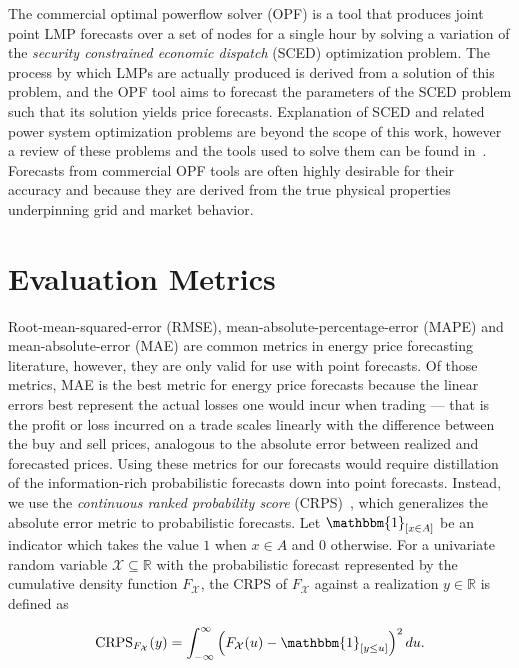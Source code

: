 The commercial optimal powerflow solver (OPF) is a tool that produces joint point LMP forecasts over a set of nodes
for a single hour by solving a variation of the \textit{security constrained economic dispatch} (SCED) optimization problem.
The process by which LMPs are actually produced is derived from a solution of this problem, and the OPF tool
aims to forecast the parameters of the SCED problem such that its solution yields price forecasts.
Explanation of SCED and related power system optimization problems are beyond the scope of this work, however a review
of these problems and the tools used to solve them can be found in~\cite{opf_textbook}.
Forecasts from commercial OPF tools are often highly desirable for their accuracy and because they are derived from the
true physical properties underpinning grid and market behavior.

\section{Evaluation Metrics}\label{sec:evaluation-metrics}

Root-mean-squared-error (RMSE), mean-absolute-percentage-error (MAPE) and mean-absolute-error (MAE) are common metrics
in energy price forecasting literature, however, they are only valid for use with point forecasts.
Of those metrics, MAE is the best metric for energy price forecasts because the linear errors best
represent the actual losses one would incur when trading --- that is the profit or loss incurred on a trade scales
linearly with the difference between the buy and sell prices, analogous to the absolute error between realized and
forecasted prices.
Using these metrics for our forecasts would require distillation of the information-rich probabilistic forecasts
down into point forecasts.
Instead, we use the \textit{continuous ranked probability score} (CRPS)~\cite{crps_rules}, which generalizes the absolute error
metric to probabilistic forecasts.
Let $\mathbbm{1}_{\left[x \in A\right]}$ be an indicator which takes the value $1$ when $x \in A$ and $0$ otherwise.
For a univariate random variable $\mathcal{X} \subseteq \mathbb{R}$ with the probabilistic forecast represented by the
cumulative density function $F_\mathcal{X}$, the CRPS of $F_\mathcal{X}$ against a realization $y \in \mathbb{R}$ is defined
as

\begin{equation}
    \text{CRPS}_{F_\mathcal{X}}(y) = \int_{-\infty}^{\infty} \left(F_\mathcal{X}(u) - \mathbbm{1}_{\left[ y \leq u \right]}\right)^2 du.
    \label{eq:crps_int}
\end{equation}

